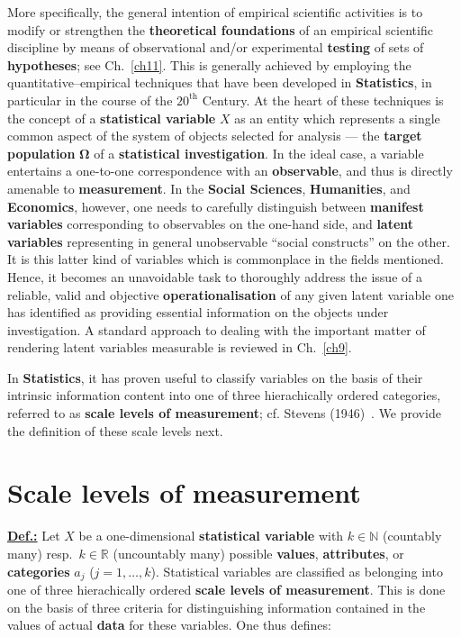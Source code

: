 \medskip
\noindent
More specifically, the general intention of empirical 
scientific activities is to modify or strengthen the
\textbf{theoretical foundations} of an empirical scientific
discipline by means of observational and/or experimental
\textbf{testing} of sets of \textbf{hypotheses}; see
Ch.~\ref{ch11}. This is generally 
achieved by employing the quantitative--empirical techniques that 
have been developed in \textbf{Statistics}, in particular in the 
course of the $20^\mathrm{th}$ Century. At the heart of these 
techniques is the concept of a \textbf{statistical variable} $X$ as 
an entity which represents a single common aspect of the system of 
objects selected for analysis --- the \textbf{target population} 
$\boldsymbol{\Omega}$ of a \textbf{statistical investigation}. In
the ideal case, a variable entertains a one-to-one correspondence
with an \textbf{observable}, and thus is directly amenable to
\textbf{measurement}. In the \textbf{Social Sciences},
\textbf{Humanities}, and \textbf{Economics}, however, one needs to
carefully distinguish between \textbf{manifest variables}
corresponding to observables on the one-hand side, and
\textbf{latent variables} representing in general unobservable
``social constructs'' on the other. It is this latter kind of
variables which is commonplace in the fields mentioned. Hence, it
becomes an unavoidable task to thoroughly address the issue of a
reliable, valid and objective \textbf{operationalisation} of any
given latent variable one has identified as providing essential
information on the objects under investigation. A standard approach
to dealing with the important matter of rendering latent variables
measurable is reviewed in Ch.~\ref{ch9}.

\medskip
\noindent
In \textbf{Statistics}, it has proven useful to classify variables
on the basis of their intrinsic information content into one of
three hierachically ordered categories, referred to as
\textbf{scale levels of measurement}; cf. Stevens
(1946)~. We provide the definition of these scale
levels next.

\section[Scale levels of measurement]{Scale levels of measurement}
\underline{\textbf{Def.:}} Let $X$ be a one-dimensional
\textbf{statistical variable} with $k \in \mathbb{N}$ (countably
many) resp.\ $k \in \mathbb{R}$ (uncountably many) possible
\textbf{values}, \textbf{attributes}, or \textbf{categories}
$a_{j}$ ($j=1,\ldots,k$). Statistical variables
are classified as belonging into one of three hierachically ordered 
\textbf{scale levels of measurement}. This is done on the basis of 
three criteria for distinguishing information contained in the 
values of actual \textbf{data} for these variables. One thus
defines:

